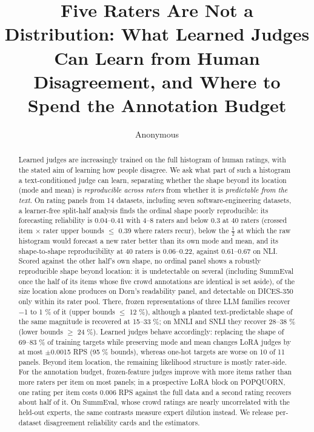 \documentclass[10pt]{article}
\title{Five Raters Are Not a Distribution: What Learned Judges Can Learn from Human Disagreement, and Where to Spend the Annotation Budget}
\author{Anonymous}
\begin{document}
\maketitle
\begin{abstract}
Learned judges are increasingly trained on the full histogram of human ratings, with the stated aim of learning how people disagree. We ask what part of such a histogram a text-conditioned judge can learn, separating whether the shape beyond its location (mode and mean) is \emph{reproducible across raters} from whether it is \emph{predictable from the text}. On rating panels from 14 datasets, including seven software-engineering datasets, a learner-free split-half analysis finds the ordinal shape poorly reproducible: its forecasting reliability is 0.04--0.41 with 4--8 raters and below 0.3 at 40 raters (crossed item $\times$ rater upper bounds $\leq$ 0.39 where raters recur), below the $\tfrac12$ at which the raw histogram would forecast a new rater better than its own mode and mean, and its shape-to-shape reproducibility at 40 raters is 0.06--0.22, against 0.61--0.67 on NLI. Scored against the other half's own shape, no ordinal panel shows a robustly reproducible shape beyond location: it is undetectable on several (including SummEval once the half of its items whose five crowd annotations are identical is set aside), of the size location alone produces on Dorn's readability panel, and detectable on DICES-350 only within its rater pool. There, frozen representations of three LLM families recover $-$1 to 1 \% of it (upper bounds $\leq$ 12 \%), although a planted text-predictable shape of the same magnitude is recovered at 15--33 \%; on MNLI and SNLI they recover 28--38 \% (lower bounds $\geq$ 24 \%). Learned judges behave accordingly: replacing the shape of 69--83 \% of training targets while preserving mode and mean changes LoRA judges by at most $\pm$0.0015 RPS (95 \% bounds), whereas one-hot targets are worse on 10 of 11 panels. Beyond item location, the remaining likelihood structure is mostly rater-side. For the annotation budget, frozen-feature judges improve with more items rather than more raters per item on most panels; in a prospective LoRA block on POPQUORN, one rating per item costs 0.006 RPS against the full data and a second rating recovers about half of it. On SummEval, whose crowd ratings are nearly uncorrelated with the held-out experts, the same contrasts measure expert dilution instead. We release per-dataset disagreement reliability cards and the estimators.
\end{abstract}
\end{document}
